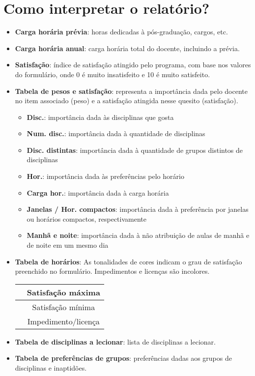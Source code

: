 \documentclass[a4paper,10pt]{article}
\begin{document}
\section*{Como interpretar o relatório?}

\begin{itemize}
\item \textbf{Carga horária prévia}: horas dedicadas à pós-graduação,
  cargos, etc.
\item \textbf{Carga horária anual}: carga horária total do docente,
  incluindo a prévia.
\item \textbf{Satisfação}: índice de satisfação atingido pelo
  programa, com base nos valores do formulário, onde 0 é muito
  insatisfeito e 10 é muito satisfeito.
\item \textbf{Tabela de pesos e satisfação}: representa a importância
  dada pelo docente no item associado (peso) e a satisfação atingida nesse
  quesito (satisfação).
  \begin{itemize}
  \item \textbf{Disc.}: importância dada às disciplinas que gosta
  \item \textbf{Num. disc.}: importância dada à quantidade de
    disciplinas
  \item \textbf{Disc. distintas}: importância dada à quantidade de
    grupos distintos de disciplinas
  \item \textbf{Hor.}: importância dada às preferências pelo horário
  \item \textbf{Carga hor.}: importância dada à carga horária
  \item \textbf{Janelas / Hor. compactos}: importância dada à
    preferência por janelas ou horários compactos, respectivamente
  \item \textbf{Manhã e noite}: importância dada à não atribuição de
    aulas de manhã e de noite em um mesmo dia
  \end{itemize}

\item \textbf{Tabela de horários}: As tonalidades de cores indicam o
  grau de satisfação preenchido no formulário. Impedimentos e licenças
  são incolores.
  \begin{center}
    \begin{tabular}{|cc|}
      \toprule
      \cellcolor[RGB]{165,252,115} & Satisfação máxima \\ \midrule
      \cellcolor[RGB]{176,176,176} & Satisfação mínima \\ \midrule
      \cellcolor[gray]{1} & Impedimento/licença\\ \bottomrule
    \end{tabular}
  \end{center}
  
\item \textbf{Tabela de disciplinas a lecionar}: lista de disciplinas
  a lecionar.
\item \textbf{Tabela de preferências de grupos}: preferências dadas
  aos grupos de disciplinas e inaptidões.

\end{itemize}
\end{document}
